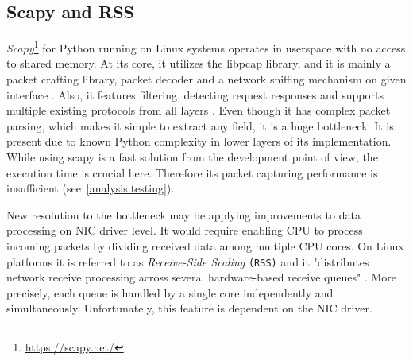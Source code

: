 \documentclass[12pt,a4paper,twoside]{book}
\begin{document}
        \subsection{Scapy and RSS} \label{analysis:mechs:scapy_rss}
            \emph{Scapy}\footnote{\url{https://scapy.net/}} for Python running on Linux systems operates in userspace with no access to shared memory. At its core, it utilizes the libpcap library, and it is mainly a packet crafting library, packet decoder and a network sniffing mechanism on given interface \cite{web:scapy}. Also, it features filtering, detecting request responses and supports multiple existing protocols from all layers \cite{docs:scapy}. Even though it has complex packet parsing, which makes it simple to extract any field, it is a huge bottleneck. It is present due to known Python complexity in lower layers of its implementation. While using scapy is a fast solution from the development point of view, the execution time is crucial here. Therefore its packet capturing performance is insufficient (see~\autoref{analysis:testing}).\par
            New resolution to the bottleneck may be applying improvements to data processing on NIC driver level. It would require enabling CPU to process incoming packets by dividing received data among multiple CPU cores. On Linux platforms it is referred to as \emph{Receive-Side Scaling} \texttt{(RSS)} and it "distributes network receive processing across several hardware-based receive queues" \cite{web:redhat:rss}. More precisely, each queue is handled by a single core independently and simultaneously. Unfortunately, this feature is dependent on the NIC driver.
\end{document}
